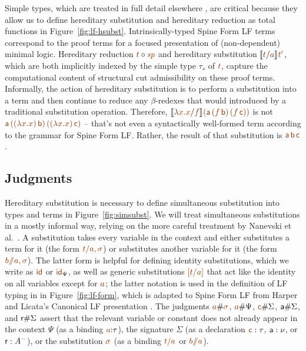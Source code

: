 Simple types, which are treated in full detail elsewhere
\cite{harper07mechanizing,reed09hybrid}, are critical because they
allow us to define hereditary substitution and hereditary reduction as
total functions in Figure~\ref{fig:lf-hsubst}. Intrinsically-typed
Spine Form LF terms correspond to the proof terms for a focused
presentation of (non-dependent) minimal logic. Hereditary reduction
$\subst{\lf{t}}{\lf{\spi}}$ and hereditary substitution $\rsubst{\lf
  t}{\lf a}{\lf{t'}}$, which are both implicitly indexed by the simple
type $\tau_s$ of $\lf t$, capture the computational content of
structural cut admissibility on these proof terms. Informally, the
action of hereditary substitution is to perform a substitution into a
term and then continue to reduce any $\beta$-redexes that would
introduced by a traditional substitution operation.  Therefore,
$\rsubst{\lf{\lambda x. x}}{\lf f}{\lf{({\sf a}\,(f\,{\sf
      b})\,(f\,{\sf c}))}}$ is not $\lf{{\sf a}\,((\lambda x.x)\,{\sf
    b})\,((\lambda x.x)\,{\sf c})}$ -- that's not even a syntactically
well-formed term according to the grammar for Spine Form LF. Rather,
the result of that substitution is $\lf{{\sf a}\,{\sf b}\,{\sf c}}$.

\subsection{Judgments}

Hereditary substitution is necessary to define simultaneous
substitution into types and terms in Figure~\ref{fig:simsubst}.  We
will treat simultaneous substitutions in a mostly informal way,
relying on the more careful treatment by Nanevski et
al.~\cite{nanevski08contextual}. A substitution takes every variable
in the context and either substitutes a term for it (the form
$\lf{t/a,\sigma}$) or substitutes another variable for it (the form
$\lf{b/\!\!/a,\sigma}$). The latter form is helpful for defining
identity substitutions, which we write as $\lf{\sf id}$ or $\lf{\sf
  id}_\Psi$, as well as generic substitutions $\lf{[t/a]}$ that act
like the identity on all variables except for $\lf{a}$; the latter
notation is used in the definition of LF typing in in
Figure~\ref{fig:lf-form}, which is adapted to Spine Form LF from
Harper and Licata's Canonical LF presentation
\cite{harper07mechanizing}. The judgments $\lf{a}\#\lf{\sigma}$,
$\lf{a}\#\Psi$, $\lf{\sf c}\#\Sigma$, ${\sf a}\#\Sigma$, and ${\sf
  r}\#\Sigma$ assert that the relevant variable or constant does not
already appear in the context $\Psi$ (as a binding $\lf{a}{:}\tau$),
the signature $\Sigma$ (as a declaration $\lf{\sf c} : \tau$, ${\sf a}
: \nu$, or ${\sf r} : A^-$), or the substitution $\lf{\sigma}$ (as a
binding $\lf{t/a}$ or \mbox{$\lf{b/\!\!/a}$}).

